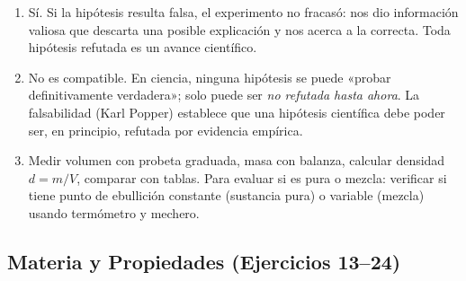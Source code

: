 \documentclass[12pt, letterpaper]{article}
\begin{document}
\begin{enumerate}[leftmargin=*, label=\textbf{\arabic*.}]
    \item Sí. Si la hipótesis resulta falsa, el experimento no fracasó: nos dio información valiosa que descarta una posible explicación y nos acerca a la correcta. Toda hipótesis refutada es un avance científico.

    \item No es compatible. En ciencia, ninguna hipótesis se puede «probar definitivamente verdadera»; solo puede ser \emph{no refutada hasta ahora}. La falsabilidad (Karl Popper) establece que una hipótesis científica debe poder ser, en principio, refutada por evidencia empírica.

    \item Medir volumen con probeta graduada, masa con balanza, calcular densidad $d = m/V$, comparar con tablas. Para evaluar si es pura o mezcla: verificar si tiene punto de ebullición constante (sustancia pura) o variable (mezcla) usando termómetro y mechero.
  \end{enumerate}

  \subsection*{Materia y Propiedades (Ejercicios 13--24)}
\end{document}
